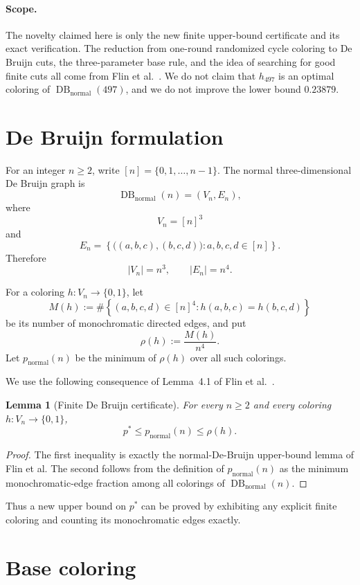 \documentclass[11pt]{article}
\newtheorem{lemma}[theorem]{Lemma}
\newcommand{\DB}{\operatorname{DB}}
\newcommand{\normal}{\mathrm{normal}}
\newcommand{\1}{\mathbf{1}}
\begin{document}
\paragraph{Scope.}
The novelty claimed here is only the new finite upper-bound certificate and
its exact verification.  The reduction from one-round randomized cycle
coloring to De Bruijn cuts, the three-parameter base rule, and the idea of
searching for good finite cuts all come from Flin et al.~\cite{flin2026arxiv}.
We do not claim that $h_{497}$ is an optimal coloring of
$\DB_{\normal}(497)$, and we do not improve the lower bound $0.23879$.

\section{De Bruijn formulation}

For an integer $n\ge2$, write $[n]=\{0,1,\dots,n-1\}$.  The normal
three-dimensional De Bruijn graph is
\[
  \DB_{\normal}(n)=(V_n,E_n),
\]
where
\[
  V_n=[n]^3
\]
and
\[
  E_n=
  \left\{
    \bigl((a,b,c),(b,c,d)\bigr):a,b,c,d\in[n]
  \right\}.
\]
Therefore
\[
  |V_n|=n^3,
  \qquad
  |E_n|=n^4.
\]

For a coloring $h:V_n\to\{0,1\}$, let
\[
  M(h):=
  \#\left\{
    (a,b,c,d)\in[n]^4:
    h(a,b,c)=h(b,c,d)
  \right\}
\]
be its number of monochromatic directed edges, and put
\[
  \rho(h):=\frac{M(h)}{n^4}.
\]
Let $p_{\normal}(n)$ be the minimum of $\rho(h)$ over all such colorings.

We use the following consequence of Lemma~4.1 of Flin et al.~\cite{flin2026arxiv}.

\begin{lemma}[Finite De Bruijn certificate]
For every $n\ge2$ and every coloring $h:V_n\to\{0,1\}$,
\[
  p^*\le p_{\normal}(n)\le\rho(h).
\]
\end{lemma}

\begin{proof}
The first inequality is exactly the normal-De-Bruijn upper-bound lemma of
Flin et al.  The second follows from the definition of
$p_{\normal}(n)$ as the minimum monochromatic-edge fraction among all
colorings of $\DB_{\normal}(n)$.
\end{proof}

Thus a new upper bound on $p^*$ can be proved by exhibiting any explicit
finite coloring and counting its monochromatic edges exactly.

\section{Base coloring}
\end{document}
